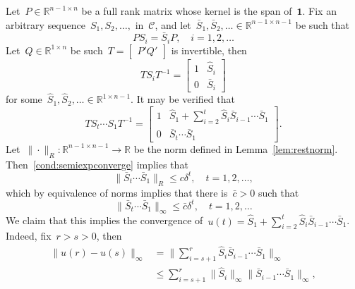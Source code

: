 \documentclass[letterpaper, 10 pt, conference]{ieeeconf}  %
\newcommand{\R}{\mathbb R}
\newcommand{\restnorm}[1]{\|#1\|_R} %
\begin{document}
    Let~$P \in \R^{n-1 \times n}$ be a full rank matrix whose kernel is the span of~$\mathbf{1}$. Fix an arbitrary sequence~$S_1,S_2,\dots,$ in~$\mathcal{C}$, and let~$\bar S_1, \bar S_2, \dots \in \R^{n-1 \times n-1}$ be such that
    \begin{equation}
        PS_i = \bar S_i P, \quad i=1,2,\dots
    \end{equation}
    Let~$Q \in \R^{1 \times n}$ be such~$T = \begin{bmatrix} P' Q' \end{bmatrix}$ is invertible, then
    \begin{equation}
        TS_iT^{-1} = \begin{bmatrix}
            1 & \hat S_i \\
            0 & \bar S_i
        \end{bmatrix}
    \end{equation}
    for some~$\hat S_1, \hat S_2, \dots \in \R^{1 \times n-1}$. It may be verified that
    \begin{equation}
        TS_t \cdots S_1T^{-1} = \begin{bmatrix}
            1 & \hat S_1 + \sum_{i=2}^t \hat S_i \bar S_{i-1} \cdots \bar S_1 \\
            0 & \bar S_t \cdots \bar S_1
        \end{bmatrix}.
    \end{equation}
    Let~$\restnorm{\cdot} : \R^{n-1 \times n-1} \to \R$ be the norm defined in Lemma~\ref{lem:restnorm}. Then~\eqref{cond:semiexpconverge} implies that
    \begin{equation}
        \restnorm{\bar S_t \cdots \bar S_1} \le c \delta^t, \quad t=1,2,\dots,
    \end{equation}
    which by equivalence of norms implies that there is~$\bar c > 0$ such that
    \begin{equation}\label{eq:bar_infty_exp}
        \|\bar S_t \cdots \bar S_1\|_\infty \le \bar c \delta^t, \quad t=1,2,\dots
    \end{equation}
    We claim that this implies the convergence of~$u(t) = \hat S_1 + \sum_{i = 2}^t \hat S_i \bar S_{i-1} \cdots \bar S_1$. Indeed, fix~$r>s>0$, then
    \begin{align*}
        \|u(r) - u(s)\|_\infty &= \|\sum_{i=s+1}^r \hat S_i \bar S_{i-1} \cdots \bar S_1 \|_\infty \\
            &\le \sum_{i=s+1}^r \| \hat S_i \|_\infty \|\bar S_{i-1} \cdots \bar S_1 \|_\infty,
    \end{align*}
\end{document}
